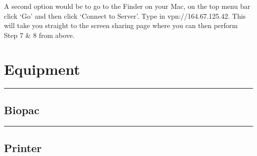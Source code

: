 \documentclass[]{book}
\begin{document}
A second option would be to go to the Finder on your Mac, on the top menu bar click `Go' and then click `Connect to Server'. Type in vpn://164.67.125.42. This will take you straight to the screen sharing page where you can then perform Step 7 \& 8 from above.

\hypertarget{equipment}{%
\section{Equipment}\label{equipment}}

\begin{center}\rule{0.5\linewidth}{0.5pt}\end{center}

\hypertarget{biopac}{%
\subsection{Biopac}\label{biopac}}

\begin{center}\rule{0.5\linewidth}{0.5pt}\end{center}

\hypertarget{printer}{%
\subsection{Printer}\label{printer}}
\end{document}
